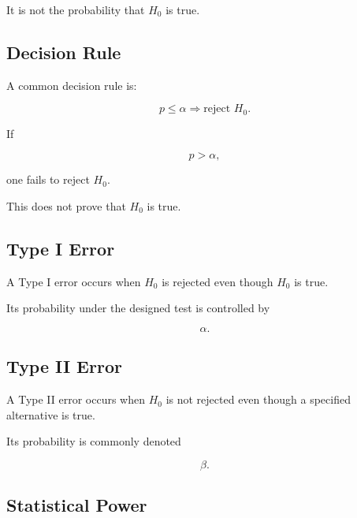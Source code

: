It is not the probability that \(H_0\) is true.

\subsection{Decision Rule}
\label{subsec:hypothesis-test-decision-rule}

A common decision rule is:

\[
\boxed{
p\leq\alpha
\Longrightarrow
\text{reject }H_0.
}
\]

If

\[
p>\alpha,
\]

one fails to reject \(H_0\).

This does not prove that \(H_0\) is true.

\subsection{Type I Error}
\label{subsec:type-one-error-reference}

A Type I error occurs when \(H_0\) is rejected even though \(H_0\) is true.

Its probability under the designed test is controlled by

\[
\boxed{
\alpha.
}
\]

\subsection{Type II Error}
\label{subsec:type-two-error-reference}

A Type II error occurs when \(H_0\) is not rejected even though a specified
alternative is true.

Its probability is commonly denoted

\[
\boxed{
\beta.
}
\]

\subsection{Statistical Power}
\label{subsec:statistical-power-reference}

